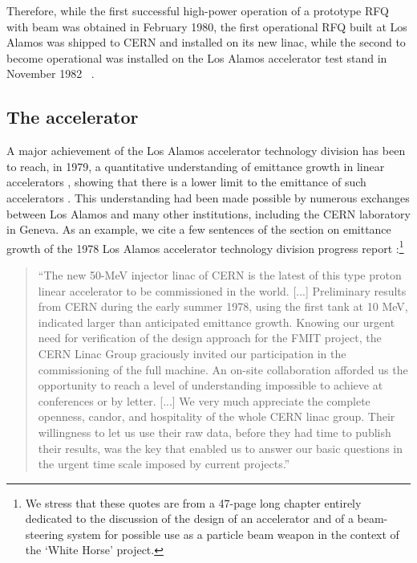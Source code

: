 \documentclass [12pt,a4paper,     ]{report} %
\begin{document}
Therefore, while the first successful high-power operation of a prototype RFQ with beam was obtained in February 1980, the first operational RFQ built at Los Alamos was shipped to CERN and installed on its new linac, while the second to become operational was installed on the Los Alamos accelerator test stand in November 1982~ \cite[p.53]{JAMES1984-}.


\subsection{The accelerator}

  A major achievement of the Los Alamos accelerator technology division has been to reach, in 1979, a quantitative understanding of emittance growth in linear accelerators \cite{JAMES1979-}, showing that there is a lower limit to the emittance of such accelerators \cite{STAPL1979-}.  This understanding had been made possible by numerous exchanges between Los Alamos and many other institutions, including the CERN laboratory in Geneva. As an example, we cite a few sentences of the section on emittance growth of the 1978 Los Alamos accelerator technology division progress report \cite[p.63,64,71]{KNAPP1980-}:\footnote{We stress that these quotes are from a 47-page long chapter entirely dedicated to the discussion of the design of an accelerator and of a beam-steering system for possible use as a particle beam weapon in the context of the `White Horse' project.}


\begin{quote}
``The new 50-MeV injector linac of CERN is the latest of this type proton linear accelerator to be commissioned in the world. [...] Preliminary results from CERN during the early summer 1978, using the first tank at 10 MeV, indicated larger than anticipated emittance growth.  Knowing our urgent need for verification of the design approach for the FMIT project, the CERN Linac Group graciously invited our participation in the commissioning of the full machine.  An on-site collaboration afforded us the opportunity to reach a level of understanding impossible to achieve at conferences or by letter. [...] We very much appreciate the complete openness, candor, and hospitality of the whole CERN linac group.  Their willingness to let us use their raw data, before they had time to publish their results, was the key that enabled us to answer our basic questions in the urgent time scale imposed by current projects.''
\end{quote}
\end{document}
